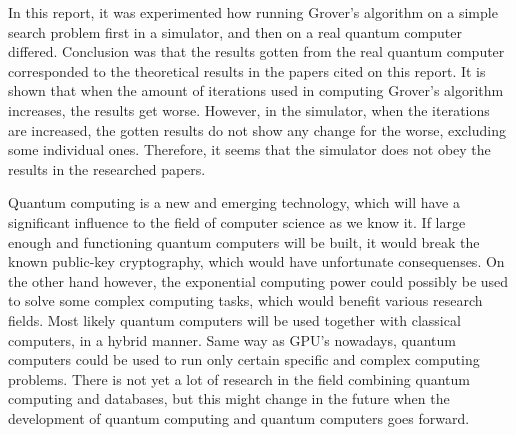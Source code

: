 \documentclass[english,oneside,openright]{UH_DS_report}
\begin{document}
In this report, it was experimented how running Grover's algorithm on a simple search problem first in a simulator, and then on a real quantum computer differed. Conclusion was that the results gotten from the real quantum computer corresponded to the theoretical results in the papers cited on this report. It is shown that when the amount of iterations used in computing Grover's algorithm increases, the results get worse. However, in the simulator, when the iterations are increased, the gotten results do not show any change for the worse, excluding some individual ones. Therefore, it seems that the simulator does not obey the results in the researched papers.

Quantum computing is a new and emerging technology, which will have a significant influence to the field of computer science as we know it. If large enough and functioning quantum computers will be built, it would break the known public-key cryptography, which would have unfortunate consequenses. On the other hand however, the exponential computing power could possibly be used to solve some complex computing tasks, which would benefit various research fields. Most likely quantum computers will be used together with classical computers, in a hybrid manner. Same way as GPU's nowadays, quantum computers could be used to run only certain specific and  complex computing problems. There is not yet a lot of research in the field combining quantum computing and databases, but this might change in the future when the development of quantum computing and quantum computers goes forward.


% 
\cleardoublepage %

\renewcommand\bibname{References}
\addcontentsline{toc}{chapter}{\bibname} %

\end{document}
